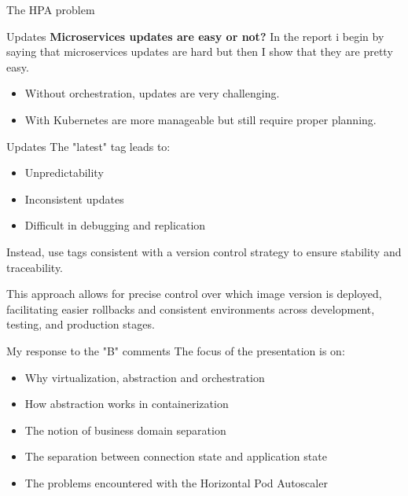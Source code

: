 \documentclass{beamer}
\begin{document}
\begin{frame}{The HPA problem}
	
\end{frame}
	

\begin{frame}{Updates}
	\textbf{Microservices updates are easy or not?}
	In the report i begin by saying that microservices updates are hard but then I show that they are pretty easy.
	\begin{itemize}
		\item Without orchestration, updates are very challenging.
		\item With Kubernetes are more manageable but still require proper planning.
	\end{itemize}
\end{frame}
\begin{frame}{Updates}
	The "latest" tag leads to:
	\begin{itemize}
		\item Unpredictability
		\item Inconsistent updates
		\item Difficult in debugging and replication
	\end{itemize}
	\begin{block}{}
		Instead, use tags consistent with a version control strategy to ensure stability and traceability.
	\end{block}
	This approach allows for precise control over which image version is deployed, facilitating easier rollbacks and consistent environments across development, testing, and production stages.
\end{frame}



\begin{frame}{My response to the "B" comments}
		\label{index_2}
		The focus of the presentation is on:
			\begin{itemize}
				\item Why virtualization, abstraction and orchestration
				\item How abstraction works in containerization
				\item The notion of business domain separation
				\item The separation between connection state and application state
				\item The problems encountered with the Horizontal Pod Autoscaler
			\end{itemize}
\end{frame}
\end{document}
